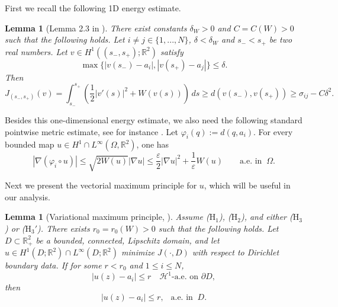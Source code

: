 \documentclass[leqno,11pt]{amsart}
\let\pa=\partial
\let\d=\delta
\let\f=\frac
\let\Om=\Omega
\let\e=\varepsilon
\let\pa=\partial
\let\na=\nabla
\newcommand{\beqo}{\begin{equation*}}
\newcommand{\eeqo}{\end{equation*}}
\newtheorem{lemma}[theorem]{Lemma}
\theoremstyle{remark}
\newcommand{\BR}{\mathbb{R}}
\newcommand{\ch}{\mathcal{H}^1}
\begin{document}
First we recall the following 1D energy estimate.

\begin{lemma}[Lemma 2.3 in \cite{AF}]\label{lemma: 1D energy estimate}
There exist constants $\delta_W>0$ and $C=C(W)>0$ such that the following holds. Let $i\neq j \in \{1,...,N\}$, $\d <\d_W$ and $s_-<s_+$ be two real numbers. Let $v\in H^1((s_-,s_+);\BR^2)$ satisfy
\beqo
\max\{|v(s_-)-a_i|,|v(s_+)-a_j|\}\leq\delta.
\eeqo
Then
\beqo
J_{(s_-,s_+)}(v)=\int_{s_-}^{s_+}\left(\f12|v'(s)|^2+W(v(s))\right)\,ds\geq d(v(s_-),v(s_+))\geq \sigma_{ij}-C\delta^2.
\eeqo
\end{lemma}


Besides this one-dimensional energy estimate, we also need the following standard pointwise metric estimate, see for instance \cite[Proposition 2.1]{Baldo}. Let $\varphi_i(q):=d(q,a_i)$. For every bounded map $u\in H^1\cap L^\infty(\Om,\BR^2)$, one has
\begin{equation}\label{est: Dphi}
    |\na (\varphi_i\circ u)|\leq \sqrt{2W(u)}|\na u|\leq \frac{\e}{2}|\na u|^2 +\frac{1}{\e}W(u)\qquad \text{a.e. in }\ \Om.
\end{equation}
  
Next we present the vectorial maximum principle for $u$, which will be useful in our analysis.

\begin{lemma}[Variational maximum principle, \cite{AF2}]\label{lemma: maximum principle}
Assume ($\mathrm{H}_1$), ($\mathrm{H}_2$), and either ($\mathrm{H}_3$) or ($\mathrm{H}_3'$). There exists  $r_0=r_0(W)>0$ such that the following holds. Let $D\subset\mathbb{R}_+^2$ be a bounded, connected, Lipschitz domain, and let $u\in H^1(D;\BR^2)\cap L^\infty(D;\BR^2)$ minimize $J(\cdot,D)$ with respect to Dirichlet boundary data. If for some $r<r_0$ and $1\leq i\leq N$, 
\begin{equation*}
    | u(z)-a_i|\leq r \quad \ch\text{-a.e. on }\pa D, 
\end{equation*}
    then 
\begin{equation*}
        | u(z)-a_i|\leq r,\ \ \text{ a.e. in }\  D.
\end{equation*}
\end{lemma}
\end{document}
